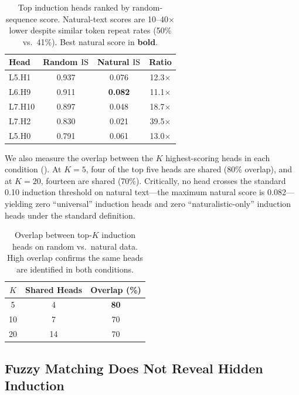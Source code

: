 \begin{table}[t]
    \centering
    \caption{Top induction heads ranked by random-sequence score. Natural-text scores are 10--40$\times$ lower despite similar token repeat rates (50\% vs.\ 41\%). Best natural score in \textbf{bold}.}
    \label{tab:top_heads}
    \begin{tabular}{@{}lccc@{}}
        \toprule
        Head & Random $\text{IS}$ & Natural $\text{IS}$ & Ratio \\
        \midrule
        L5.H1  & 0.937 & 0.076 & 12.3$\times$ \\
        L6.H9  & 0.911 & \textbf{0.082} & 11.1$\times$ \\
        L7.H10 & 0.897 & 0.048 & 18.7$\times$ \\
        L7.H2  & 0.830 & 0.021 & 39.5$\times$ \\
        L5.H0  & 0.791 & 0.061 & 13.0$\times$ \\
        \bottomrule
    \end{tabular}
\end{table}

We also measure the overlap between the $K$ highest-scoring heads in each condition ().
At $K = 5$, four of the top five heads are shared (80\% overlap), and at $K = 20$, fourteen are shared (70\%).
Critically, no head crosses the standard 0.10 induction threshold on natural text---the maximum natural score is 0.082---yielding zero ``universal'' induction heads and zero ``naturalistic-only'' induction heads under the standard definition.

\begin{table}[t]
    \centering
    \caption{Overlap between top-$K$ induction heads on random vs.\ natural data. High overlap confirms the same heads are identified in both conditions.}
    \label{tab:overlap}
    \begin{tabular}{@{}ccc@{}}
        \toprule
        $K$ & Shared Heads & Overlap (\%) \\
        \midrule
        5  & 4  & \textbf{80} \\
        10 & 7  & 70 \\
        20 & 14 & 70 \\
        \bottomrule
    \end{tabular}
\end{table}

\subsection{Fuzzy Matching Does Not Reveal Hidden Induction}
\label{sec:results_fuzzy}

